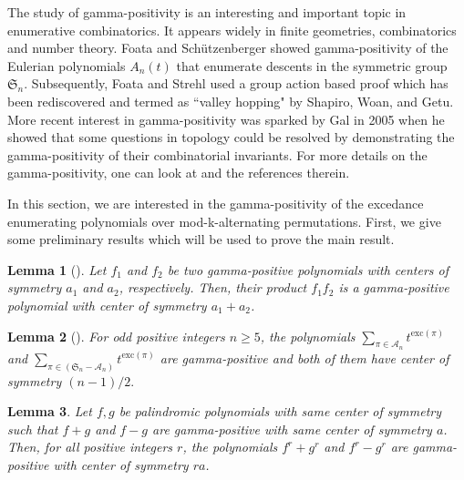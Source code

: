 \documentclass[12pt]{article}
\newcommand{\SSS}{\mathfrak{S}}
\newcommand{\AAA}{\mathcal{A}}
\newcommand{\exc}{\mathrm{exc}}
\newtheorem{lemma}{\bf Lemma}[section]
\begin{document}
The study of gamma-positivity is an interesting and important topic in enumerative combinatorics. It appears widely in finite geometries, combinatorics and number theory.  Foata and Sch{\"u}tzenberger \cite{foata-schu} showed gamma-positivity of the Eulerian polynomials $A_n(t)$ that enumerate descents in the symmetric group $\mathfrak{S}_n.$ Subsequently, Foata and Strehl \cite{foata-strehl} 
used a group action based proof which has been rediscovered and termed as ``valley hopping" by Shapiro, Woan, and Getu. More recent interest in gamma-positivity was sparked by Gal \cite{gal} in 2005 when he showed that some questions in topology could be resolved by demonstrating the gamma-positivity of their combinatorial invariants. For more details on the gamma-positivity, one can look at \cite{athanasiadis,han,ma-ma-yeh-descent,Ma-ma-yeh} and the references therein. 

In this section, we are interested in the gamma-positivity of the excedance enumerating polynomials over mod-k-alternating permutations. First, we give some preliminary results which will be used to prove the main result. 

\begin{lemma}[{\cite[Lemma 1]{Dey-Siva-annals-com}}]
\label{lem:gamma-pos-under-prod}
Let $f_1$ and $f_2$ be two gamma-positive polynomials with centers of symmetry $a_1$ and $a_2$, respectively. Then, their product $f_1f_2$ is a gamma-positive polynomial with center of symmetry $a_1+a_2$. 
\end{lemma}


\begin{lemma}[{\cite[Theorem 4]{Dey-Siva-annals-com}}]
\label{lem:gamma-pos-excedance}
For odd positive integers $n\geq 5$, the polynomials 
$\sum_{\pi \in \AAA_n} t^{\exc(\pi)}$ and $\sum_{\pi \in (\SSS_n -\AAA_n)} t^{\exc(\pi)}$ are gamma-positive and both of them have center of symmetry $(n-1)/2.$
\end{lemma}


\begin{lemma}
\label{lem:fgtofsqrgsqr}
Let $f,g$ be palindromic polynomials with same center of symmetry such that $f+g$ and $f-g$ are gamma-positive with same center of symmetry $a$. Then, for all positive integers $r$, the polynomials $f^r+g^r$ and $f^r-g^r$ are gamma-positive with center of symmetry $ra$. 
\end{lemma}
\end{document}
